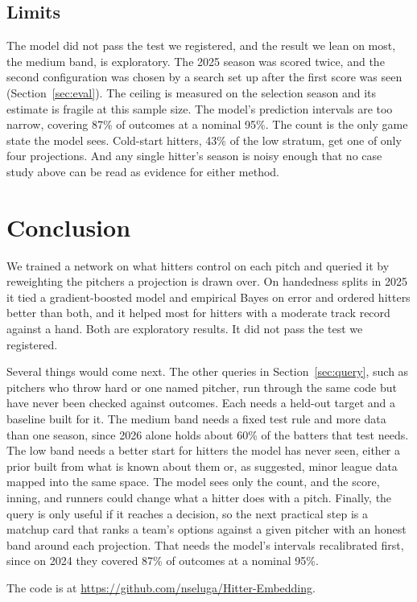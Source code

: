 \documentclass[11pt,letterpaper]{article}
\begin{document}
\subsection{Limits}
\label{sec:limits}

The model did not pass the test we registered, and the result we lean on most, the medium band, is exploratory. The 2025 season was scored twice, and the second configuration was chosen by a search set up after the first score was seen (Section~\ref{sec:eval}). The ceiling is measured on the selection season and its estimate is fragile at this sample size. The model's prediction intervals are too narrow, covering 87\% of outcomes at a nominal 95\%. The count is the only game state the model sees. Cold-start hitters, 43\% of the low stratum, get one of only four projections. And any single hitter's season is noisy enough that no case study above can be read as evidence for either method.

\section{Conclusion}
\label{sec:conclusion}

We trained a network on what hitters control on each pitch and queried it by reweighting the pitchers a projection is drawn over. On handedness splits in 2025 it tied a gradient-boosted model and empirical Bayes on error and ordered hitters better than both, and it helped most for hitters with a moderate track record against a hand. Both are exploratory results. It did not pass the test we registered.

Several things would come next. The other queries in Section~\ref{sec:query}, such as pitchers who throw hard or one named pitcher, run through the same code but have never been checked against outcomes. Each needs a held-out target and a baseline built for it. The medium band needs a fixed test rule and more data than one season, since 2026 alone holds about 60\% of the batters that test needs. The low band needs a better start for hitters the model has never seen, either a prior built from what is known about them or, as \citet{alcorn2018} suggested, minor league data mapped into the same space. The model sees only the count, and the score, inning, and runners could change what a hitter does with a pitch. Finally, the query is only useful if it reaches a decision, so the next practical step is a matchup card that ranks a team's options against a given pitcher with an honest band around each projection. That needs the model's intervals recalibrated first, since on 2024 they covered 87\% of outcomes at a nominal 95\%.

The code is at \url{https://github.com/nseluga/Hitter-Embedding}.

\clearpage


\end{document}

